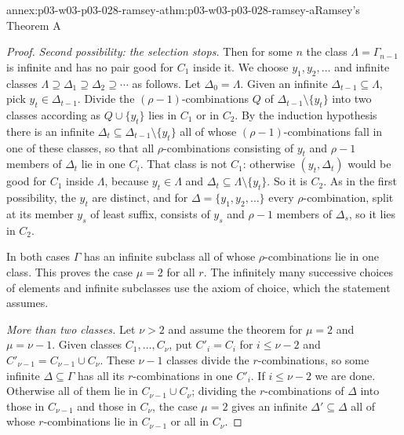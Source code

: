 \begin{annexitem}{annex:p03-w03-p03-028-ramsey-a}{thm:p03-w03-p03-028-ramsey-a}{Ramsey's Theorem A}
\begin{proof}
\emph{Second possibility: the selection stops.}  Then for some \(n\) the
class \(\Lambda=\Gamma_{n-1}\) is infinite and has no pair good for \(C_1\)
inside it.  We choose \(y_1,y_2,\ldots\) and infinite classes
\(\Lambda\supseteq\Delta_1\supseteq\Delta_2\supseteq\cdots\) as follows.
Let \(\Delta_0=\Lambda\).  Given an infinite \(\Delta_{t-1}\subseteq
\Lambda\), pick \(y_t\in\Delta_{t-1}\).  Divide the
\((\rho-1)\)-combinations \(Q\) of \(\Delta_{t-1}\setminus\{y_t\}\) into
two classes according as \(Q\cup\{y_t\}\) lies in \(C_1\) or in \(C_2\).
By the induction hypothesis there is an infinite
\(\Delta_t\subseteq\Delta_{t-1}\setminus\{y_t\}\) all of whose
\((\rho-1)\)-combinations fall in one of these classes, so that all
\(\rho\)-combinations consisting of \(y_t\) and \(\rho-1\) members of
\(\Delta_t\) lie in one \(C_i\).  That class is not \(C_1\): otherwise
\((y_t,\Delta_t)\) would be good for \(C_1\) inside \(\Lambda\), because
\(y_t\in\Lambda\) and \(\Delta_t\subseteq\Lambda\setminus\{y_t\}\).  So
it is \(C_2\).  As in the first possibility, the \(y_t\) are distinct, and
for \(\Delta=\{y_1,y_2,\ldots\}\) every \(\rho\)-combination, split at its
member \(y_s\) of least suffix, consists of \(y_s\) and \(\rho-1\) members
of \(\Delta_s\), so it lies in \(C_2\).

In both cases \(\Gamma\) has an infinite subclass all of whose
\(\rho\)-combinations lie in one class.  This proves the case \(\mu=2\)
for all \(r\).  The infinitely many successive choices of elements and
infinite subclasses use the axiom of choice, which the statement assumes.

\emph{More than two classes.}  Let \(\nu>2\) and assume the theorem for
\(\mu=2\) and \(\mu=\nu-1\).  Given classes \(C_1,\ldots,C_\nu\), put
\(C'_i=C_i\) for \(i\leq\nu-2\) and \(C'_{\nu-1}=C_{\nu-1}\cup C_\nu\).
These \(\nu-1\) classes divide the \(r\)-combinations, so some infinite
\(\Delta\subseteq\Gamma\) has all its \(r\)-combinations in one \(C'_i\).
If \(i\leq\nu-2\) we are done.  Otherwise all of them lie in
\(C_{\nu-1}\cup C_\nu\); dividing the \(r\)-combinations of \(\Delta\) into
those in \(C_{\nu-1}\) and those in \(C_\nu\), the case \(\mu=2\) gives an
infinite \(\Delta'\subseteq\Delta\) all of whose \(r\)-combinations lie in
\(C_{\nu-1}\) or all in \(C_\nu\).
\end{proof}
\end{annexitem}

